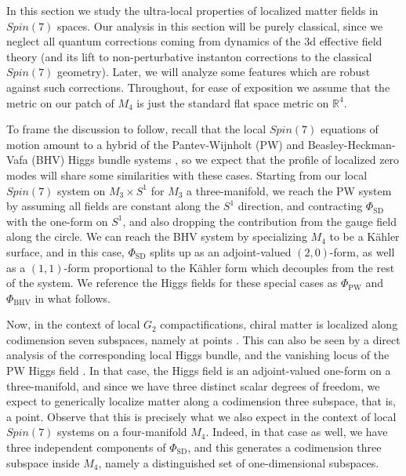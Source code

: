 \documentclass[12pt]{article}%
\numberwithin{equation}{section}
\renewcommand{\(}{\left(}
\renewcommand{\)}{\right)}
\renewcommand{\[}{\left[}
\renewcommand{\]}{\right]}
\begin{document}
In this section we study the ultra-local properties of localized matter fields in $Spin(7)$ spaces. Our analysis in this section will be purely classical, since we neglect all quantum corrections coming from dynamics of the 3d effective field theory (and its lift to non-perturbative instanton corrections to the classical $Spin(7)$ geometry). Later, we will analyze some features which are robust against such corrections.
Throughout, for ease of exposition we assume that the metric on our patch of $M_4$ is just the standard flat space metric on $\mathbb{R}^4$.

To frame the discussion to follow, recall that the local $Spin(7)$ equations of motion amount to a hybrid of the Pantev-Wijnholt (PW) and Beasley-Heckman-Vafa (BHV) Higgs bundle systems \cite{Cvetic:2020piw}, so we expect that the profile of localized zero modes will share some similarities with these cases. Starting from our local $Spin(7)$ system on $M_3 \times S^1$ for $M_3$ a three-manifold, we reach the PW system by assuming all fields are constant along the $S^1$ direction, and contracting $\Phi_{\mathrm{SD}}$ with the one-form on $S^1$, and also dropping the contribution from the gauge field along the circle. We can reach the BHV system by specializing $M_4$ to be a K\"ahler surface, and in this case, $\Phi_{\mathrm{SD}}$ splits up as an adjoint-valued $(2,0)$-form, as well as a $(1,1)$-form proportional to the K\"ahler form which decouples from the rest of the system. We reference the Higgs fields for these special cases as $\Phi_{\mathrm{PW}}$ and $\Phi_{\mathrm{BHV}}$ in what follows.

Now, in the context of local $G_2$ compactifications, chiral matter is localized along codimension seven subspaces, namely at points \cite{Acharya:2001gy, Acharya:2002vs}. This can also be seen by a direct analysis of the corresponding local Higgs bundle, and the vanishing locus of the PW Higgs field \cite{Pantev:2009de, Braun:2018vhk, Barbosa:2019bgh}. In that case, the Higgs field is an adjoint-valued one-form on a three-manifold, and since we have three distinct scalar degrees of freedom, we expect to generically localize matter along a codimension three subspace, that is, a point. Observe that this is precisely what we also expect in the context of local $Spin(7)$ systems on a four-manifold $M_4$. Indeed, in that case as well, we have three independent components of $\Phi_{\mathrm{SD}}$, and this generates a codimension three subspace inside $M_4$, namely a distinguished set of one-dimensional subspaces.
\end{document}
